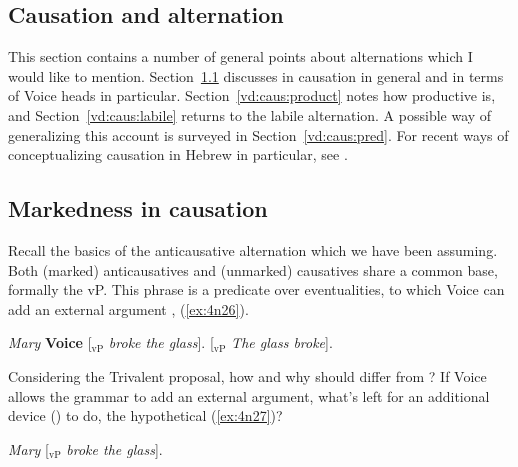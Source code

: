 \begin{exe}
\begin{xlist}
\begin{xlist}
\begin{exe}
\begin{exe}
\begin{xlist}
\begin{exe}
\begin{xlist}
\begin{exe}
\begin{xlist}
\begin{xlist}
\begin{exe}
\begin{xlist}
\begin{exe}
\begin{xlist}
\begin{exe}
\begin{xlist}
\begin{exe}
\begin{exe}
\begin{exe}
\begin{xlist}
\begin{exe}
\begin{exe}
\begin{xlist}
\begin{xlist}
\begin{exe}
\begin{xlist}
\begin{exe}
\begin{exe}
\begin{xlist}
\begin{exe}
\begin{exe}
\begin{xlist}
\begin{exe}
\begin{xlist}
\begin{exe}
\begin{xlist}
\section{Causation and alternation} \label{vd:caus}
This section contains a number of general points about  alternations which I would like to mention. Section~\ref{vd:caus:mrkd} discusses  in causation in general and in terms of Voice heads in particular. Section~\ref{vd:caus:product} notes how productive {\vd} is, and Section~\ref{vd:caus:labile} returns to the labile alternation. A possible way of generalizing this account is surveyed in Section~\ref{vd:caus:pred}. For recent ways of conceptualizing causation in Hebrew in particular, see \cite{barashersiegalboneh18wccfl}.

	\subsection{Markedness in causation} \label{vd:caus:mrkd}
Recall the basics of the anticausative alternation which we have been assuming. Both (marked) anticausatives and (unmarked) causatives share a common base, formally the vP. This phrase is a predicate over eventualities, to which Voice can add an external argument \citep{schaefer08,layering15}, (\ref{ex:4n26}).

 \begin{exe}
 \ex   \label{ex:4n26}
 \begin{xlist} 
 	\ex  \emph{Mary} \textbf{Voice} [$_{\text{vP}}$ \emph{broke the glass}]. 
 	\ex  {\zero} \textbf{\vz} [$_{\text{vP}}$ \emph{The glass broke}]. 
 \z
\z 

Considering the Trivalent proposal, how and why should {\vd} differ from ? If Voice allows the grammar to add an external argument, what's left for an additional device (\vd) to do, the hypothetical (\ref{ex:4n27})?

 \begin{exe}
\ex  \label{ex:4n27}\emph{Mary} \textbf{\vd} [$_{\text{vP}}$ \emph{broke the glass}]. 
 \z 


\end{exe}
\end{xlist}
\end{exe}
\end{xlist}
\end{exe}
\end{xlist}
\end{exe}
\end{xlist}
\end{exe}
\end{exe}
\end{xlist}
\end{exe}
\end{exe}
\end{xlist}
\end{exe}
\end{xlist}
\end{xlist}
\end{exe}
\end{exe}
\end{xlist}
\end{exe}
\end{exe}
\end{exe}
\end{xlist}
\end{exe}
\end{xlist}
\end{exe}
\end{xlist}
\end{exe}
\end{xlist}
\end{xlist}
\end{exe}
\end{xlist}
\end{exe}
\end{xlist}
\end{exe}
\end{exe}
\end{xlist}
\end{xlist}
\end{exe}
